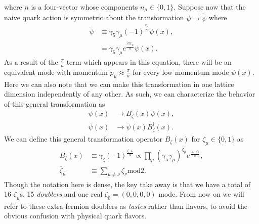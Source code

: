 where $n$ is a four-vector whose components $n_\mu \in \{0,1\}$.  Suppose now that the naive quark action is symmetric about the transformation $\psi \rightarrow \tilde{\psi}$ where
\begin{equation}\label{eq:spinor_transform}
\begin{split}
        \tilde{\psi} &\equiv \gamma_5\gamma_\mu (-1)^\frac{x_\mu}{a}\psi(x),\\
        &=  \gamma_5\gamma_\mu e^\frac{i\pi x_\mu}{a} \psi(x). 
\end{split}
\end{equation}
As a result of the $\frac{\pi}{a}$ term which appears in this equation, there will be an equivalent mode with momentum $p_\mu \approx \frac{\pi}{a}$ for every low momentum mode $\psi(x)$.  Here we can also note that we can make this transformation in one lattice dimension independently of any other.  As such, we can characterize the behavior of this general transformation as
\begin{equation}\label{eq:doubler_transform}
    \begin{split}
        \psi(x) &\rightarrow B_\zeta (x) \psi(x), \\
        \overline{\psi}(x) &\rightarrow \overline{\psi}(x) B^\dagger_\zeta (x).
    \end{split}
\end{equation}
We can define this general transformation operator $B_\zeta (x)$ for $\zeta_\mu \in \{0,1\}$ as 
\begin{equation}\label{eq:general_transformation}
\begin{split}
    B_\zeta(x) &\equiv \gamma_{\overline{\zeta}}(-1)^\frac{\zeta \cdot x}{a}\propto 
    \prod_\mu (\gamma_5 \gamma_\mu)^{\zeta_\mu}e^\frac{ix\cdot\zeta\pi}{a},\\
    \overline{\zeta}_\mu &\equiv \sum_{\mu \neq \nu} \zeta_\nu \mathrm{mod}2.
\end{split}
\end{equation}
Though the notation here is dense, the key take away is that we have a total of 16 $\zeta_\mu$s, 15 \textit{doublers} and one real $\zeta_0 = (0,0,0,0)$ mode.  From now on we will refer to these extra fermion doublers as \textit{tastes} rather than flavors, to avoid the obvious confusion with physical quark flavors.

